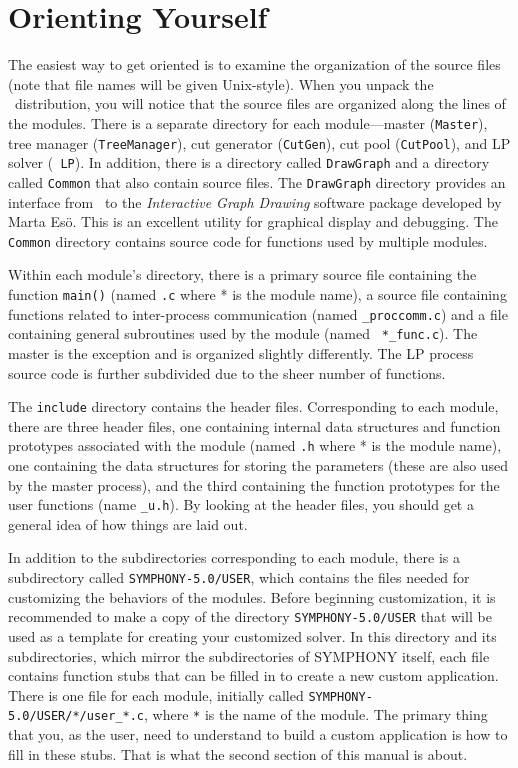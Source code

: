 \section{Orienting Yourself}

The easiest way to get oriented is to examine the organization of the source
files (note that file names will be given Unix-style). When you unpack the
\BB\ distribution, you will notice that the source files are organized along
the lines of the modules.  There is a separate directory for each
module---master ({\tt Master}), tree manager ({\tt TreeManager}), cut
generator ({\tt CutGen}), cut pool ({\tt CutPool}), and LP solver ({\tt
LP}). In addition, there is a directory called {\tt DrawGraph} and a directory
called {\tt Common} that also contain source files. The {\tt DrawGraph}
directory provides an interface from \BB\ to the {\em Interactive Graph
Drawing} software package developed by Marta Es\"o. This is an excellent
utility for graphical display and debugging. The {\tt Common} directory
contains source code for functions used by multiple modules.

Within each module's directory, there is a primary source file
containing the function {\tt main()} (named {\tt *.c} where * is the
module name), a source file containing functions related to
inter-process communication (named {\tt *\_proccomm.c}) and a file
containing general subroutines used by the module (named {\tt
*\_func.c}). The master is the exception and is organized slightly
differently. The LP process source code is further subdivided due to
the sheer number of functions.

The {\tt include} directory contains the header files. Corresponding
to each module, there are three header files, one containing internal
data structures and function prototypes associated with the module
(named {\tt *.h} where * is the module name), one containing the data
structures for storing the parameters (these are also used by the
master process), and the third containing the function prototypes for
the user functions (name {\tt *\_u.h}). By looking at the header files, you
should get a general idea of how things are laid out.

In addition to the subdirectories corresponding to each module, there is a
subdirectory called \texttt{SYMPHONY-5.0/USER}, which contains the files
needed for customizing the behaviors of the modules. Before beginning
customization, it is recommended to make a copy of the directory
\texttt{SYMPHONY-5.0/USER} that will be used as a template for creating your
customized solver. In this directory and its subdirectories, which mirror the
subdirectories of SYMPHONY itself, each file contains function stubs that can
be filled in to create a new custom application. There is one file for each
module, initially called \texttt{SYMPHONY-5.0/USER/*/user\_*.c}, where
\texttt{*} is the name of the module. The primary thing that you, as the user,
need to understand to build a custom application is how to fill in these
stubs. That is what the second section of this manual is about.

